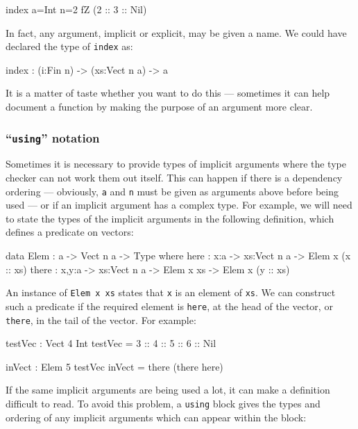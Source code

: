 \begin{code}
index {a=Int} {n=2} fZ (2 :: 3 :: Nil)
\end{code}

\noindent
In fact, any argument, implicit or explicit, may be given a name.
We could have declared the type of \texttt{index} as:

\begin{code}
index : (i:Fin n) -> (xs:Vect n a) -> a
\end{code}

\noindent
It is a matter of taste whether you want to do this --- sometimes it can help document a function by making the purpose of an argument more clear.

\subsubsection{``\texttt{using}'' notation}

Sometimes it is necessary to provide types of implicit arguments where the type checker can not work them out itself.
This can happen if there is a dependency ordering --- obviously, \texttt{a} and \texttt{n} must be given as arguments above before being used --- or if an implicit argument has a complex type.
For example, we will need to state the types of the implicit arguments in the following definition, which defines a predicate on vectors:

\begin{code}
data Elem : a -> Vect n a -> Type where
   here :  {x:a} ->   {xs:Vect n a} -> Elem x (x :: xs)
   there : {x,y:a} -> {xs:Vect n a} -> Elem x xs -> Elem x (y :: xs)
\end{code}

\noindent
An instance of \texttt{Elem x xs} states that \texttt{x} is an element of
\texttt{xs}.
We can construct such a predicate if the required element is \texttt{here}, at the head of the vector, or \texttt{there}, in the tail of the vector.
For example:

\begin{code}
testVec : Vect 4 Int
testVec = 3 :: 4 :: 5 :: 6 :: Nil

inVect : Elem 5 testVec
inVect = there (there here)
\end{code}

\noindent
If the same implicit arguments are being used a lot, it can make a definition difficult to read.
To avoid this problem, a \texttt{using} block gives the types and ordering of any implicit arguments which can appear within the block:

